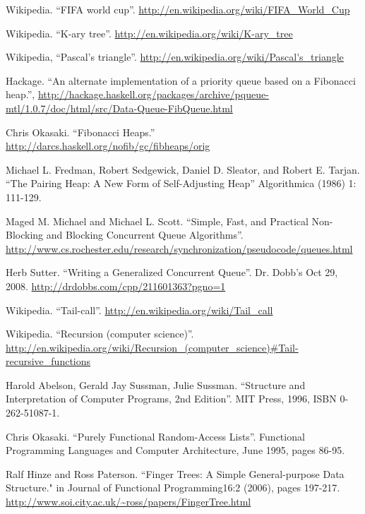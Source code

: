 \begin{thebibliography}{99}
Wikipedia. ``FIFA world cup''. \url{http://en.wikipedia.org/wiki/FIFA_World_Cup}

Wikipedia. ``K-ary tree''. \url{http://en.wikipedia.org/wiki/K-ary_tree}

Wikipedia, ``Pascal's triangle''. \url{http://en.wikipedia.org/wiki/Pascal's_triangle}

Hackage. ``An alternate implementation of a priority queue based on a Fibonacci heap.'', \url{http://hackage.haskell.org/packages/archive/pqueue-mtl/1.0.7/doc/html/src/Data-Queue-FibQueue.html}

Chris Okasaki. ``Fibonacci Heaps.'' \url{http://darcs.haskell.org/nofib/gc/fibheaps/orig}

Michael L. Fredman, Robert Sedgewick, Daniel D. Sleator, and Robert E. Tarjan. ``The Pairing Heap: A New Form of Self-Adjusting Heap'' Algorithmica (1986) 1: 111-129.

Maged M. Michael and Michael L. Scott. ``Simple, Fast, and Practical Non-Blocking and Blocking Concurrent Queue Algorithms''. \url{http://www.cs.rochester.edu/research/synchronization/pseudocode/queues.html}

Herb Sutter. ``Writing a Generalized Concurrent Queue''. Dr. Dobb's Oct 29, 2008. \url{http://drdobbs.com/cpp/211601363?pgno=1}

Wikipedia. ``Tail-call''. \url{http://en.wikipedia.org/wiki/Tail_call}

Wikipedia. ``Recursion (computer science)''. \url{http://en.wikipedia.org/wiki/Recursion_(computer_science)#Tail-recursive_functions}

Harold Abelson, Gerald Jay Sussman, Julie Sussman. ``Structure and Interpretation of Computer Programs, 2nd Edition''. MIT Press, 1996, ISBN 0-262-51087-1.


Chris Okasaki. ``Purely Functional Random-Access Lists''. Functional Programming Languages and Computer Architecture, June 1995, pages 86-95.

Ralf Hinze and Ross Paterson. ``Finger Trees: A Simple General-purpose Data Structure." in Journal of Functional Programming16:2 (2006), pages 197-217. \url{http://www.soi.city.ac.uk/~ross/papers/FingerTree.html}


\end{thebibliography}
